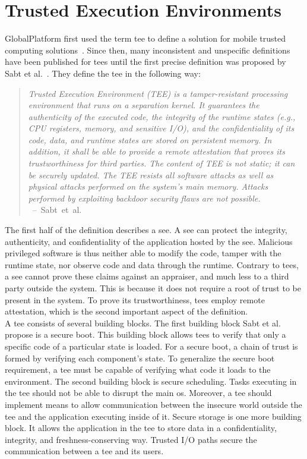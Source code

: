 \section{Trusted Execution Environments}
\label{sec:state:tee}
GlobalPlatform first used the term \gls{tee} to define a solution for mobile
trusted computing solutions~\cite{globaltee}. Since then, many inconsistent and
unspecific definitions have been published for \glspl{tee} until the first
precise definition was proposed by Sabt et al.~\cite{sabt2015trusted}. They
define the \gls{tee} in the following way:
\begin{quote}
  \textit{Trusted Execution Environment (TEE) is a tamper-resistant processing
    environment that runs on a separation kernel. It guarantees the authenticity of
    the executed code, the integrity of the runtime states (e.g., CPU registers,
    memory, and sensitive I/O), and the confidentiality of its code, data, and
    runtime states are stored on persistent memory. In addition, it shall be able
    to provide a remote attestation that proves its trustworthiness for third
    parties. The content of TEE is not static; it can be securely updated. The TEE
    resists all software attacks as well as physical attacks performed on the
    system's main memory. Attacks performed by exploiting backdoor security flaws
    are not possible. \\
  } \mbox{ -- Sabt et al.~\cite{sabt2015trusted}}
\end{quote}

The first half of the definition describes a \gls{see}. A \gls{see} can protect
the integrity, authenticity, and confidentiality of the application hosted by
the \gls{see}. Malicious privileged software is thus neither able to modify the
code, tamper with the runtime state, nor observe code and data through the
runtime. Contrary to \glspl{tee}, a \gls{see} cannot prove these claims against
an appraiser, and much less to a third party outside the system. This is because
it does not require a root of trust to be present in the system. To prove its
trustworthiness, \glspl{tee} employ remote attestation, which is the second
important aspect of the definition.\\

A \gls{tee} consists of several building blocks. The first building block Sabt
et al. propose is a secure boot. This building block allows \glspl{tee} to
verify that only a specific code of a particular state is loaded. For a secure
boot, a chain of trust is formed by verifying each component's state. To
generalize the secure boot requirement, a \gls{tee} must be capable of verifying
what code it loads to the environment. The second building block is secure
scheduling. Tasks executing in the \gls{tee} should not be able to disrupt the
main \gls{os}. Moreover, a \gls{tee} should implement means to allow
communication between the insecure world outside the \gls{tee} and the
application executing inside of it. Secure storage is one more building block.
It allows the application in the \gls{tee} to store data in a confidentiality,
integrity, and freshness-conserving way. Trusted I/O paths secure the
communication between a \gls{tee} and its users.\\

